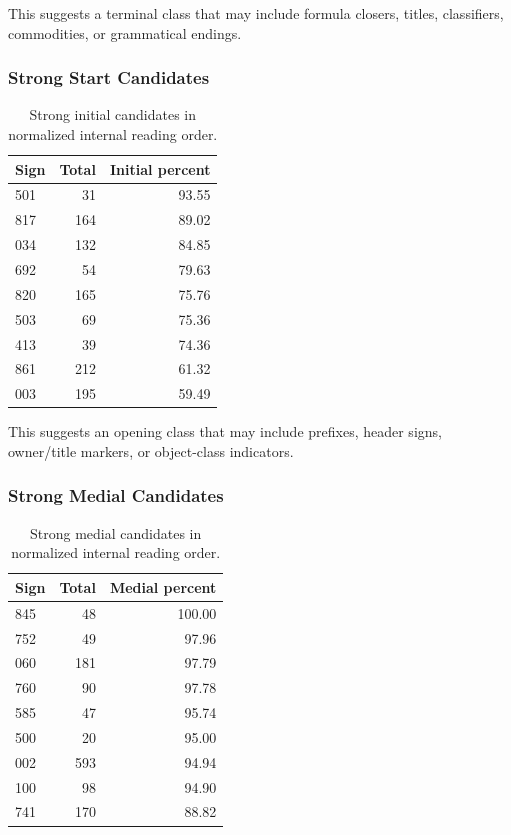 This suggests a terminal class that may include formula closers, titles, classifiers, commodities, or grammatical endings.

\subsubsection{Strong Start Candidates}

\begin{table}[htbp]
\centering
\begin{tabular}{lrr}
\toprule
\textbf{Sign} & \textbf{Total} & \textbf{Initial percent} \\
\midrule
501 & 31 & 93.55 \\
817 & 164 & 89.02 \\
034 & 132 & 84.85 \\
692 & 54 & 79.63 \\
820 & 165 & 75.76 \\
503 & 69 & 75.36 \\
413 & 39 & 74.36 \\
861 & 212 & 61.32 \\
003 & 195 & 59.49 \\
\bottomrule
\end{tabular}
\caption{Strong initial candidates in normalized internal reading order.}
\label{tab:initial-candidates}
\end{table}

This suggests an opening class that may include prefixes, header signs, owner/title markers, or object-class indicators.

\subsubsection{Strong Medial Candidates}

\begin{table}[htbp]
\centering
\begin{tabular}{lrr}
\toprule
\textbf{Sign} & \textbf{Total} & \textbf{Medial percent} \\
\midrule
845 & 48 & 100.00 \\
752 & 49 & 97.96 \\
060 & 181 & 97.79 \\
760 & 90 & 97.78 \\
585 & 47 & 95.74 \\
500 & 20 & 95.00 \\
002 & 593 & 94.94 \\
100 & 98 & 94.90 \\
741 & 170 & 88.82 \\
\bottomrule
\end{tabular}
\caption{Strong medial candidates in normalized internal reading order.}
\label{tab:medial-candidates}
\end{table}


